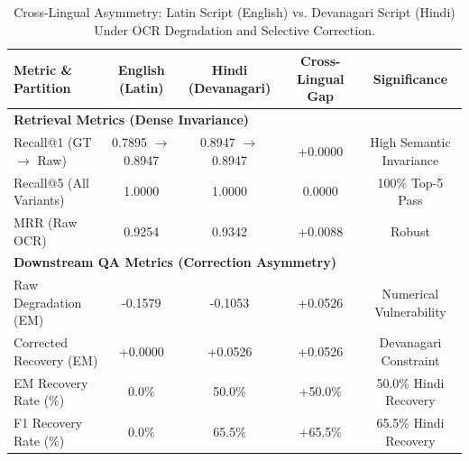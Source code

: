 \begin{table}[htbp]
\centering
\caption{Cross-Lingual Asymmetry: Latin Script (English) vs. Devanagari Script (Hindi) Under OCR Degradation and Selective Correction.}
\label{tab:cross_lingual}
\begin{tabular}{lcccc}
\toprule
\textbf{Metric \& Partition} & \textbf{English (Latin)} & \textbf{Hindi (Devanagari)} & \textbf{Cross-Lingual Gap} & \textbf{Significance} \\
\midrule
\multicolumn{5}{l}{\textbf{Retrieval Metrics (Dense Invariance)}} \\
Recall@1 (GT $\rightarrow$ Raw) & 0.7895 $\rightarrow$ 0.8947 & 0.8947 $\rightarrow$ 0.8947 & +0.0000 & High Semantic Invariance \\
Recall@5 (All Variants) & 1.0000 & 1.0000 & 0.0000 & 100\% Top-5 Pass \\
MRR (Raw OCR) & 0.9254 & 0.9342 & +0.0088 & Robust \\
\midrule
\multicolumn{5}{l}{\textbf{Downstream QA Metrics (Correction Asymmetry)}} \\
Raw Degradation (EM) & -0.1579 & -0.1053 & +0.0526 & Numerical Vulnerability \\
Corrected Recovery (EM) & +0.0000 & +0.0526 & +0.0526 & Devanagari Constraint \\
EM Recovery Rate (\%) & 0.0\% & 50.0\% & +50.0\% & 50.0\% Hindi Recovery \\
F1 Recovery Rate (\%) & 0.0\% & 65.5\% & +65.5\% & 65.5\% Hindi Recovery \\
\bottomrule
\end{tabular}
\end{table}